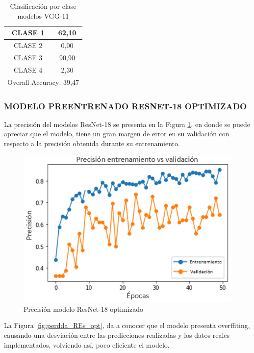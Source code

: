 \begin{table}[htbp]
	\centering
	\begin{tabular}{|c|c|}
		\hline
		CLASE 1 & 62,10 \bigstrut\\
		\hline
		CLASE 2 & 0,00 \bigstrut\\
		\hline
		CLASE 3 & 90,90 \bigstrut\\
		\hline
		CLASE 4 & 2,30 \bigstrut\\
		\hline
		\multicolumn{2}{|c|}{Overall Accuracy: 39,47} \bigstrut\\
		\hline
	\end{tabular}%
	\caption{Clasificación por clase modelos VGG-11}
	\label{tab:VGG11optclases}%
\end{table}%

\newpage	
\subsubsection{\MakeUppercase{Modelo Preentrenado ResNet-18 Optimizado}}

La precisión del modelos ResNet-18 se presenta en la Figura \ref{fig:preci_RES_OPT}, en donde se puede apreciar que el modelo, tiene un gran margen de error en su validación con respecto a la precisión obtenida durante su entrenamiento.

\begin{figure}[ht]
	\centering
	\includegraphics[scale=0.6]{Figs/512.png}
	\caption{Precisión modelo ResNet-18 optimizado}
	\label{fig:preci_RES_OPT}
\end{figure}

La Figura \ref{fig:perdda_REs_opt}, da a conocer que el modelo presenta overffiting, causando una desviación entre las predicciones realizadas y los datos reales implementados, volviendo así, poco eficiente el modelo.	

